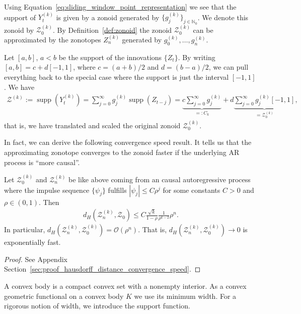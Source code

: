 Using Equation~\eqref{eq:sliding_window_point_representation} we see that the support of $Y_t^{(k)}$ is given by a zonoid generated by $\{g_j^{(k)}\}_{j\in\mathbb{N}_0}$. We denote this zonoid by $\mathcal{Z}^{(k)}_0$. By Definition~\ref{def:zonoid} the zonoid $\mathcal{Z}^{(k)}_0$ can be approximated by the zonotopes $Z^{(k)}_n$ generated by $g_0^{(k)},\dots,g_n^{(k)}$.

Let $[a,b]$, $a<b$ be the support of the innovations $\{Z_t\}$. By writing $[a,b]=c+d[-1,1]$, where $c=(a+b)/2$ and $d=(b-a)/2$, we can pull everything back to the special case where the support is just the interval $[-1,1]$. We have
\begin{align*}
    \mathcal{Z}^{(k)}:=\operatorname{supp}(Y_t^{(k)})=\sum_{j=0}^{\infty}g_j^{(k)}\operatorname{supp}(Z_{t-j})=\underbrace{c\sum_{j=0}^{\infty}g_j^{(k)}}_{=:C_k}+d\underbrace{\sum_{j=0}^{\infty}g_j^{(k)}[-1,1]}_{=\mathcal{Z}^{(k)}_0},
\end{align*}
that is, we have translated and scaled the original zonoid $\mathcal{Z}^{(k)}_0$.

In fact, we can derive the following convergence speed result. It tells us that the approximating zonotope converges to the zonoid faster if the underlying AR process is \enquote{more causal}.

\begin{Prop}\label{prop:hausdorff_distance_convergence_speed}
    Let $\mathcal{Z}^{(k)}_0$ and $\mathcal{Z}^{(k)}_n$ be like above coming from an causal autoregressive process where the impulse sequence $\{\psi_j\}$ fulfills $|\psi_j|\le C\rho^{j}$ for some constants $C>0$ and $\rho\in(0,1)$. Then
    \begin{align*}
        d_H(\mathcal{Z}_n^{(k)},\mathcal{Z}_0)\le C\frac{\sqrt{k}}{1-\rho}\frac{1}{\rho^{k-2}}\rho^n.
    \end{align*}
    In particular, $d_H(\mathcal{Z}^{(k)}_n,\mathcal{Z}^{(k)}_0)=\mathcal{O}(\rho^{n})$. That is, $d_H(\mathcal{Z}^{(k)}_n,\mathcal{Z}^{(k)}_0)\to0$ is exponentially fast.
\end{Prop}

\begin{proof}
    See Appendix Section~\ref{sec:proof_hausdorff_distance_convergence_speed}.
\end{proof}

A convex body is a compact convex set with a nonempty interior. As a convex geometric functional on a convex body $K$ we use its minimum width. For a rigorous notion of width, we introduce the support function.

